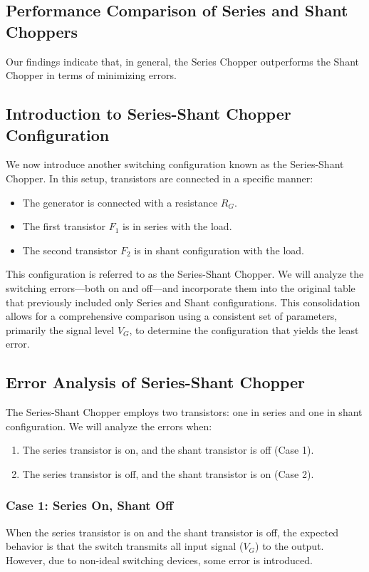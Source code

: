 \subsection{Performance Comparison of Series and Shant Choppers}
Our findings indicate that, in general, the Series Chopper outperforms the Shant Chopper in terms of minimizing errors. 

\subsection{Introduction to Series-Shant Chopper Configuration}
We now introduce another switching configuration known as the Series-Shant Chopper. In this setup, transistors are connected in a specific manner:
\begin{itemize}
    \item The generator is connected with a resistance \( R_G \).
    \item The first transistor \( F_1 \) is in series with the load.
    \item The second transistor \( F_2 \) is in shant configuration with the load.
\end{itemize}
This configuration is referred to as the Series-Shant Chopper. We will analyze the switching errors—both on and off—and incorporate them into the original table that previously included only Series and Shant configurations. This consolidation allows for a comprehensive comparison using a consistent set of parameters, primarily the signal level \( V_G \), to determine the configuration that yields the least error.

\subsection{Error Analysis of Series-Shant Chopper}
The Series-Shant Chopper employs two transistors: one in series and one in shant configuration. We will analyze the errors when:
\begin{enumerate}
    \item The series transistor is on, and the shant transistor is off (Case 1).
    \item The series transistor is off, and the shant transistor is on (Case 2).
\end{enumerate}

\subsubsection{Case 1: Series On, Shant Off}
When the series transistor is on and the shant transistor is off, the expected behavior is that the switch transmits all input signal (\( V_G \)) to the output. However, due to non-ideal switching devices, some error is introduced.

